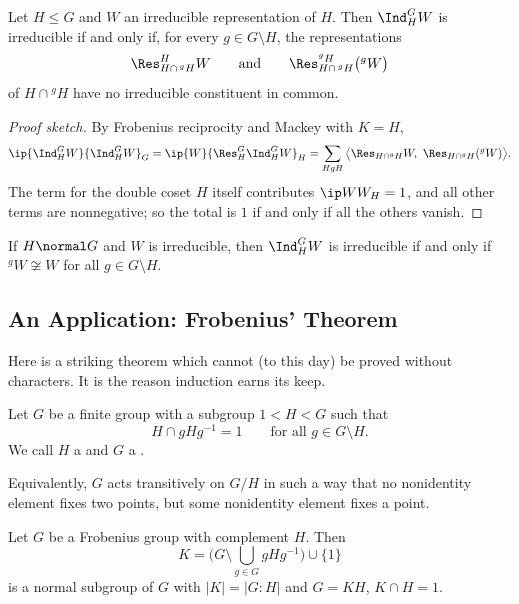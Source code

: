 \begin{corollary}
	Let $H\leq G$ and $W$ an irreducible representation of $H$. Then $\Ind_H^GW$ is irreducible if and only if, for every $g \in G\setminus H$, the representations
	$$\Res^{H}_{H\cap\, {}^gH}W \qquad\text{and}\qquad \Res^{{}^gH}_{H\cap\, {}^gH}\big({}^gW\big)$$
	of $H\cap{}^gH$ have no irreducible constituent in common.
\end{corollary}
\begin{proof}[Proof sketch]
	By Frobenius reciprocity and Mackey with $K = H$,
	$$\ip{\Ind_H^GW}{\Ind_H^GW}_G = \ip{W}{\Res^G_H\Ind_H^GW}_H = \sum_{HgH}\big\langle \Res_{H\cap{}^gH}W,\ \Res_{H\cap{}^gH}({}^gW)\big\rangle.$$
	The term for the double coset $H$ itself contributes $\ip WW_H = 1$, and all other terms are nonnegative; so the total is $1$ if and only if all the others vanish.
\end{proof}

\begin{corollary}
	If $H\normal G$ and $W$ is irreducible, then $\Ind_H^GW$ is irreducible if and only if ${}^gW\not\cong W$ for all $g\in G\setminus H$.
\end{corollary}

\subsection{An Application: Frobenius' Theorem}

Here is a striking theorem which cannot (to this day) be proved without characters. It is the reason induction earns its keep.

\begin{definition}
	Let $G$ be a finite group with a subgroup $1 < H < G$ such that
	$$H\cap gHg^{-1} = 1\qquad\text{for all } g\in G\setminus H.$$
	We call $H$ a  and $G$ a .
\end{definition}

Equivalently, $G$ acts transitively on $G/H$ in such a way that no nonidentity element fixes two points, but some nonidentity element fixes a point.

\begin{theorem}[Frobenius, 1901]
	Let $G$ be a Frobenius group with complement $H$. Then
	$$K = \Big(G\setminus\bigcup_{g\in G}gHg^{-1}\Big)\cup\{1\}$$
	is a normal subgroup of $G$ with $|K| = |G:H|$ and $G = KH$, $K\cap H = 1$.
\end{theorem}

